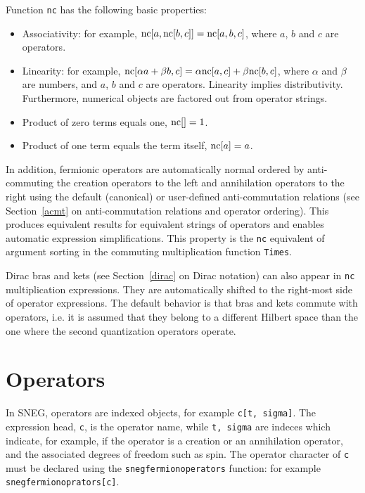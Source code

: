 \documentclass[a4paper,10pt,openany]{book}
\begin{document}
Function {\tt nc} has the following basic properties:

\begin{itemize}
\item Associativity: for example, $\mathrm{nc}[a, \mathrm{nc}[b, c]] = \mathrm{nc}[a, b, c]$,
  where $a$, $b$ and $c$ are operators.

\item Linearity: for example, $\mathrm{nc}[\alpha a+\beta b, c] = \alpha
  \mathrm{nc}[a,c] + \beta \mathrm{nc}[b,c]$, where $\alpha$ and $\beta$ are numbers,
  and $a$, $b$ and $c$ are operators.  Linearity implies
  distributivity. Furthermore, numerical objects are factored out from
  operator strings.

\item Product of zero terms equals one, $\mathrm{nc}[]=1$.

\item Product of one term equals the term itself, $\mathrm{nc}[a]=a$.
\end{itemize}

In addition, fermionic operators are automatically normal ordered by
anti-commuting the creation operators to the left and annihilation
operators to the right using the default (canonical) or user-defined
anti-commutation relations (see Section~\ref{acmt} on anti-commutation
relations and operator ordering). This produces equivalent results for
equivalent strings of operators and enables automatic expression
simplifications. This property is the {\tt nc} equivalent of argument
sorting in the commuting multiplication function {\tt Times}.

Dirac bras and kets (see Section~\ref{dirac} on Dirac notation) can
also appear in {\tt nc} multiplication expressions. They are
automatically shifted to the right-most side of operator expressions.
The default behavior is that bras and kets commute with operators,
i.e. it is assumed that they belong to a different Hilbert space than
the one where the second quantization operators operate.


\section{Operators}
\label{ops}

In SNEG, operators are indexed objects, for example {\tt c[t, sigma]}.
The expression head, {\tt c}, is the operator name, while {\tt t,
  sigma} are indeces which indicate, for example, if the operator is a
creation or an annihilation operator, and the associated degrees of
freedom such as spin. The operator character of {\tt c} must be
declared using the {\tt snegfermionoperators} function: for example {\tt
  snegfermionoprators[c]}.
\end{document}
